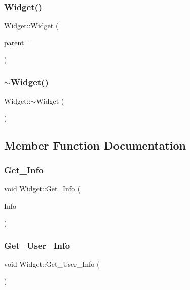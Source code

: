 \subsubsection{\texorpdfstring{Widget()}{Widget()}}
{\footnotesize\ttfamily Widget\+::\+Widget (\begin{DoxyParamCaption}\item[{Q\+Widget $\ast$}]{parent = {} }\end{DoxyParamCaption})}

\mbox{\label{class_widget_aa24f66bcbaaec6d458b0980e8c8eae65}} 
\subsubsection{\texorpdfstring{$\sim$Widget()}{~Widget()}}
{\footnotesize\ttfamily Widget\+::$\sim$\+Widget (\begin{DoxyParamCaption}{ }\end{DoxyParamCaption})}



\subsection{Member Function Documentation}
\mbox{\label{class_widget_a0b1204d50863ef19c6ed3e39ab455d25}} 
\subsubsection{\texorpdfstring{Get\_Info}{Get\_Info}}
{\footnotesize\ttfamily void Widget\+::\+Get\+\_\+\+Info (\begin{DoxyParamCaption}\item[{Q\+Byte\+Array}]{Info }\end{DoxyParamCaption})\hspace{0.3cm}{\ttfamily [slot]}}

\mbox{\label{class_widget_a349b456bf6a673058ef7449e44866e90}} 
\subsubsection{\texorpdfstring{Get\_User\_Info}{Get\_User\_Info}}
{\footnotesize\ttfamily void Widget\+::\+Get\+\_\+\+User\+\_\+\+Info (\begin{DoxyParamCaption}{ }\end{DoxyParamCaption})\hspace{0.3cm}{\ttfamily [slot]}}

